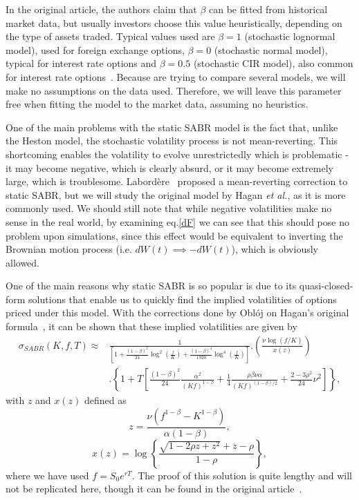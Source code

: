 In the original article, the authors claim that $\beta$ can be fitted from historical market data, but usually investors choose this value heuristically, depending on the type of assets traded. Typical values used are $\beta=1$ (stochastic lognormal model), used for foreign exchange options, $\beta=0$ (stochastic normal model), typical for interest rate options and $\beta=0.5$ (stochastic CIR model), also common for interest rate options~\citep{Hagan}.
Because are trying to compare several models, we will make no assumptions on the data used. Therefore, we will leave this parameter free when fitting the model to the market data, assuming no heuristics.

One of the main problems with the static SABR model is the fact that, unlike the Heston model, the stochastic volatility process is not mean-reverting. This shortcoming enables the volatility to evolve unrestrictedly which is problematic - it may become negative, which is clearly absurd, or it may become extremely large, which is troublesome. Labordère~\citep{Labordere} proposed a mean-reverting correction to static SABR, but we will study the original model by Hagan \textit{et al.}, as it is more commonly used. We should still note that while negative volatilities make no sense in the real world, by examining eq.\eqref{dF} we can see that this should pose no problem upon simulations, since this effect would be equivalent to inverting the Brownian motion process (i.e. $dW(t)\implies-dW(t)$), which is obviously allowed.

One of the main reasons why static SABR is so popular is due to its quasi-closed-form solutions that enable us to quickly find the implied volatilities of options priced under this model. With the corrections done by Oblój on Hagan's original formula~\citep{Obloj}, it can be shown that these implied volatilities are given by
\begin{equation}\label{sabr}
\begin{split}
\sigma_{SABR}(K,f,T)\approx&\frac{1}{\displaystyle\left[1+\frac{(1-\beta)^2}{24}\log^2\left(\frac{f}{K}\right)+\frac{(1-\beta)^4}{1920}\log^4\left(\frac{f}{K}\right)\right]}.\left(\frac{\nu\log\left(f/K\right)}{x(z)}\right)\\
&.\left\{1+T\left[\frac{(1-\beta)^2}{24}\frac{\alpha^2}{(Kf)^{1-\beta}}+\frac{1}{4}\frac{\rho\beta\nu\alpha}{(Kf)^{(1-\beta)/2}}+\frac{2-3\rho^2}{24}\nu^2\right]\right\},
\end{split}
\end{equation}
\noindent with $z$ and $x(z)$ defined as
\begin{equation}
z=\frac{\nu\left(f^{1-\beta}-K^{1-\beta}\right)}{\alpha(1-\beta)},
\end{equation}
\begin{equation}
x(z)=\log\left\{\frac{\sqrt{1-2\rho z+z^2}+z-\rho}{1-\rho}\right\},
\end{equation}
\noindent where we have used $f=S_0e^{rT}$. The proof of this solution is quite lengthy and will not be replicated here, though it can be found in the original article~\citep{Hagan}.

